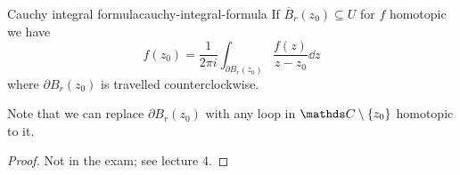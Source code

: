 \documentclass[12pt]{extarticle}
\begin{document}
\begin{theorem}{Cauchy integral formula}{cauchy-integral-formula}
	If $\overline B_r(z_0) \subseteq U$ for $f$ homotopic we have
	\begin{equation}
		f(z_0) = \frac{1}{2 \pi i} \int_{\partial B_r(z_0)} \frac{f(z)}{z - z_0} \dd z
	\end{equation}
	where $\partial B_r(z_0)$ is travelled counterclockwise.
\end{theorem}

Note that we can replace $\partial B_r(z_0)$ with any loop in $\C \setminus \{z_0\}$
homotopic to it.

\begin{proof}
	Not in the exam; see lecture 4.
\end{proof}
\end{document}
